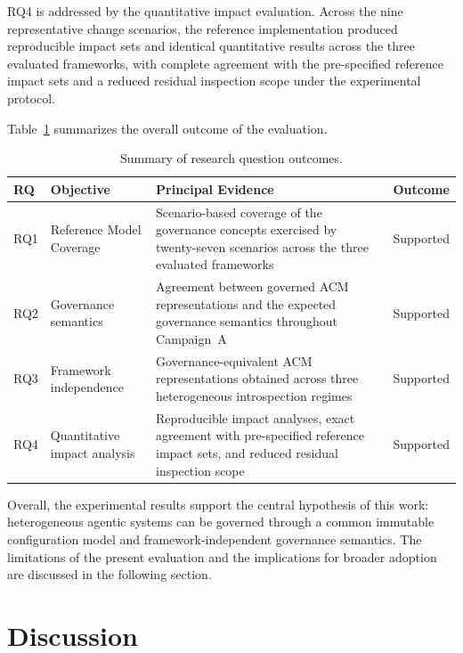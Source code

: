 \documentclass[10pt]{article}
\begin{document}
RQ4 is addressed by the quantitative impact evaluation. Across the nine representative change scenarios, the reference implementation produced reproducible impact sets and identical quantitative results across the three evaluated frameworks, with complete agreement with the pre-specified reference impact sets and a reduced residual inspection scope under the experimental protocol.

Table~\ref{tab:rq_summary} summarizes the overall outcome of the evaluation.

\begin{table}[ht]
	\centering
	\caption{Summary of research question outcomes.}
	\label{tab:rq_summary}
	\small
	\begin{tabular}{p{0.9cm}p{2.5cm}p{5.1cm}p{1.6cm}}
		\toprule
		\textbf{RQ} &
		\textbf{Objective} &
		\textbf{Principal Evidence} &
		\textbf{Outcome}
		\\
		\midrule
		
		RQ1 &
		Reference Model Coverage &
		Scenario-based coverage of the governance concepts exercised by twenty-seven scenarios across the three evaluated frameworks &
		Supported
		\\
		
		RQ2 &
		Governance semantics &
		Agreement between governed ACM representations and the expected governance semantics throughout Campaign~A &
		Supported
		\\
		
		RQ3 &
		Framework independence &
		Governance-equivalent ACM representations obtained across three heterogeneous introspection regimes & Supported
		\\
		
		RQ4 &
		Quantitative impact analysis &
		Reproducible impact analyses, exact agreement with pre-specified reference
		impact sets, and reduced residual inspection scope &
		Supported
		\\
		
		\bottomrule
	\end{tabular}
\end{table}

Overall, the experimental results support the central hypothesis of this work: heterogeneous agentic systems can be governed through a common immutable configuration model and framework-independent governance semantics. The limitations of the present evaluation and the implications for broader adoption are discussed in the following section.

\section{Discussion}
\label{sec:discussion}
\end{document}
